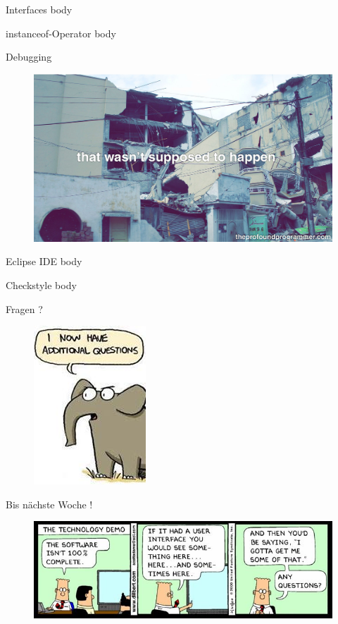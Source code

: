 \documentclass[18pt]{beamer}
\begin{document}
\begin{frame}{Interfaces}
    body
\end{frame}

\begin{frame}{instanceof-Operator}
    body
\end{frame}

\appendix
\beginbackup

\begin{frame}{Debugging}
    \begin{figure}
        \includegraphics[scale=.15]{img/NG8XW8J8GT.jpg}
    \end{figure}
\end{frame}

\begin{frame}{Eclipse IDE}
    body
\end{frame}

\begin{frame}{Checkstyle}
    body
\end{frame}

\begin{frame}{Fragen ?}
    \begin{figure}
        \includegraphics[scale=.6]{img/additionalquestions.jpg}
    \end{figure}
\end{frame}

\begin{frame}{Bis nächste Woche !}
    \begin{figure}
        \includegraphics[scale=.6]{img/dilbert-software-demo.jpg}
    \end{figure}
\end{frame}

\backupend
\end{document}
